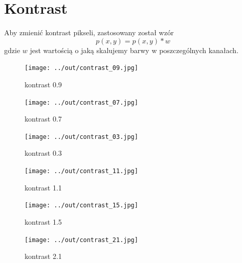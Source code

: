 \documentclass[a4paper,12pt]{article}
\begin{document}
\newpage
\section{Kontrast}
Aby zmienić kontrast pikseli, zastosowany został wzór
$$p(x, y) = p(x, y) * w$$
gdzie $w$ jest wartością o jaką skalujemy barwy w poszczególnych kanałach.



\begin{figure}[h!]
\begin{minipage}[t]{5cm}
\begin{center}
\texttt{[image: ../out/contrast\_09.jpg]}
\caption{kontrast 0.9}
\end{center}
\end{minipage}
\hfill
\begin{minipage}[t]{5cm}
\begin{center}
\texttt{[image: ../out/contrast\_07.jpg]}
\caption{kontrast 0.7}
\end{center}
\end{minipage}
\hfill
\begin{minipage}[t]{5cm}
\begin{center}
\texttt{[image: ../out/contrast\_03.jpg]}
\caption{kontrast 0.3}
\end{center}
\end{minipage}
\end{figure}

\begin{figure}[h!]
\begin{minipage}[t]{5cm}
\begin{center}
\texttt{[image: ../out/contrast\_11.jpg]}
\caption{kontrast 1.1}
\end{center}
\end{minipage}
\hfill
\begin{minipage}[t]{5cm}
\begin{center}
\texttt{[image: ../out/contrast\_15.jpg]}
\caption{kontrast 1.5}
\end{center}
\end{minipage}
\hfill
\begin{minipage}[t]{5cm}
\begin{center}
\texttt{[image: ../out/contrast\_21.jpg]}
\caption{kontrast 2.1}
\end{center}
\end{minipage}
\end{figure}
\end{document}
